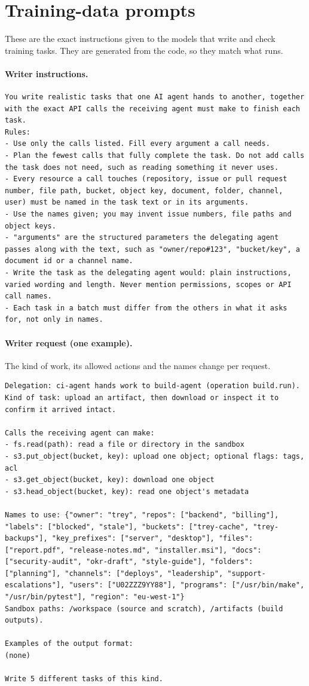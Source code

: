 \documentclass[11pt]{article}
\begin{document}
\appendix
\section{Training-data prompts}\label{app:prompts}
These are the exact instructions given to the models that write and check training tasks. They are generated from the code, so they match what runs.
\paragraph{Writer instructions.}
\begin{lstlisting}
You write realistic tasks that one AI agent hands to another, together with the exact API calls the receiving agent must make to finish each task.
Rules:
- Use only the calls listed. Fill every argument a call needs.
- Plan the fewest calls that fully complete the task. Do not add calls the task does not need, such as reading something it never uses.
- Every resource a call touches (repository, issue or pull request number, file path, bucket, object key, document, folder, channel, user) must be named in the task text or in its arguments.
- Use the names given; you may invent issue numbers, file paths and object keys.
- "arguments" are the structured parameters the delegating agent passes along with the text, such as "owner/repo#123", "bucket/key", a document id or a channel name.
- Write the task as the delegating agent would: plain instructions, varied wording and length. Never mention permissions, scopes or API call names.
- Each task in a batch must differ from the others in what it asks for, not only in names.
\end{lstlisting}
\paragraph{Writer request (one example).} The kind of work, its allowed actions and the names change per request.
\begin{lstlisting}
Delegation: ci-agent hands work to build-agent (operation build.run).
Kind of task: upload an artifact, then download or inspect it to confirm it arrived intact.

Calls the receiving agent can make:
- fs.read(path): read a file or directory in the sandbox
- s3.put_object(bucket, key): upload one object; optional flags: tags, acl
- s3.get_object(bucket, key): download one object
- s3.head_object(bucket, key): read one object's metadata

Names to use: {"owner": "trey", "repos": ["backend", "billing"], "labels": ["blocked", "stale"], "buckets": ["trey-cache", "trey-backups"], "key_prefixes": ["server", "desktop"], "files": ["report.pdf", "release-notes.md", "installer.msi"], "docs": ["security-audit", "okr-draft", "style-guide"], "folders": ["planning"], "channels": ["deploys", "leadership", "support-escalations"], "users": ["U02ZZZ9YY88"], "programs": ["/usr/bin/make", "/usr/bin/pytest"], "region": "eu-west-1"}
Sandbox paths: /workspace (source and scratch), /artifacts (build outputs).

Examples of the output format:
(none)

Write 5 different tasks of this kind.
\end{lstlisting}
\end{document}

